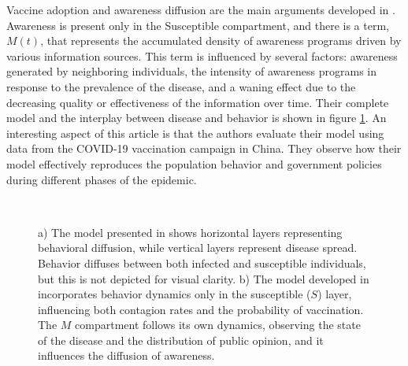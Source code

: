 Vaccine adoption and awareness diffusion are the main arguments developed in \cite{Zuo2022}. Awareness is present only in the Susceptible compartment, and there is a term, $M(t)$, that represents the accumulated density of awareness programs driven by various information sources. This term is influenced by several factors: awareness generated by neighboring individuals, the intensity of awareness programs in response to the prevalence of the disease, and a waning effect due to the decreasing quality or effectiveness of the information over time. Their complete model and the interplay between disease and behavior is shown in figure  \ref{fig:mean_models_1}. 
An interesting aspect of this article is that the authors evaluate their model using data from the COVID-19 vaccination campaign in China. They observe how their model effectively reproduces the population behavior and government policies during different phases of the epidemic.

\begin{figure}[h]
	\centering
	 \quad
	 \\
	\caption[Mean field models literature review]{a) The model presented in \cite{Tanaka_2002} shows horizontal layers representing behavioral diffusion, while vertical layers represent disease spread. Behavior diffuses between both infected and susceptible individuals, but this is not depicted for visual clarity. b) The model developed in \cite{Zuo2022} incorporates behavior dynamics only in the susceptible ($S$) layer, influencing both contagion rates and the probability of vaccination. The $M$ compartment follows its own dynamics, observing the state of the disease and the distribution of public opinion, and it influences the diffusion of awareness.}
	\label{fig:mean_models_1}
\end{figure}

